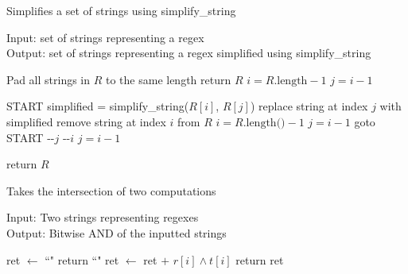 \documentclass[runningheads]{llncs}
\begin{document}
\begin{algorithm}[H]
\caption{Simplifies a set of strings using simplify\_string}
Input: set of strings representing a regex\\
Output: set of strings representing a regex simplified using simplify\_string
\begin{algorithmic}
    \State Pad all strings in $R$ to the same length
     return $R$
        \EndIf
    \State $i = R\text{.length} - 1$
    \State $j = i - 1$
    
    \State START
            \State simplified = simplify\_string($R[i]$, $R[j]$) 
                \State replace string at index $j$ with simplified
                \State remove string at index $i$ from $R$
                \State $i = R\text{.length()} - 1$
                \State $j = i - 1$
                \State goto START
                \EndIf
            \State -{}-$j$
            \EndWhile
        \State -{}-$i$
        \State $j = i - 1$
        \EndWhile
        
    \State return $R$
\EndProcedure
\end{algorithmic}
\end{algorithm}
\begin{algorithm}[H]
\caption{Takes the intersection of two computations}
Input: Two strings representing regexes\\
Output: Bitwise AND of the inputted strings
\begin{algorithmic}
    \State ret $\leftarrow$ ``" 
         return ``"
        \Else \hspace{1mm} ret $\leftarrow$ ret $+$ $r[i] \land t[i]$
        \EndIf
    \EndFor
    \State return ret
\EndProcedure
\end{algorithmic}
\end{algorithm}
\end{document}
